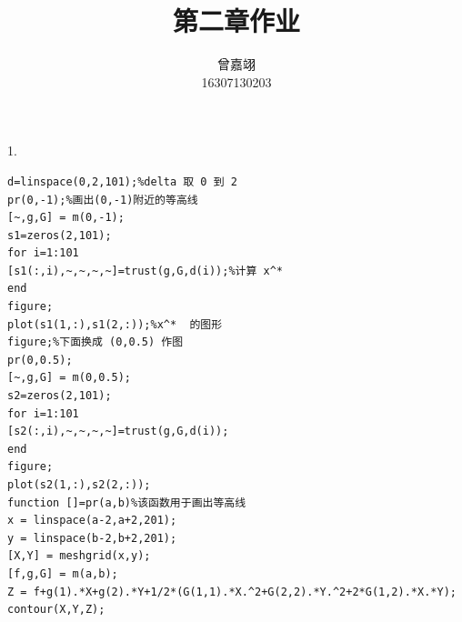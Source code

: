\documentclass{article}
\title{第二章作业}
\author{曾嘉翊\\16307130203}
\date{}
\begin{document}
\maketitle
\thispagestyle{empty}
1.
\begin{lstlisting}
d=linspace(0,2,101);%delta 取 0 到 2
pr(0,-1);%画出(0,-1)附近的等高线
[~,g,G] = m(0,-1);
s1=zeros(2,101);
for i=1:101
[s1(:,i),~,~,~,~]=trust(g,G,d(i));%计算 x^*
end
figure;
plot(s1(1,:),s1(2,:));%x^*  的图形
figure;%下面换成 (0,0.5) 作图
pr(0,0.5);
[~,g,G] = m(0,0.5);
s2=zeros(2,101);
for i=1:101
[s2(:,i),~,~,~,~]=trust(g,G,d(i));
end
figure;
plot(s2(1,:),s2(2,:));
function []=pr(a,b)%该函数用于画出等高线
x = linspace(a-2,a+2,201);
y = linspace(b-2,b+2,201);
[X,Y] = meshgrid(x,y);
[f,g,G] = m(a,b);
Z = f+g(1).*X+g(2).*Y+1/2*(G(1,1).*X.^2+G(2,2).*Y.^2+2*G(1,2).*X.*Y);
contour(X,Y,Z);
\end{lstlisting}
\end{document}
